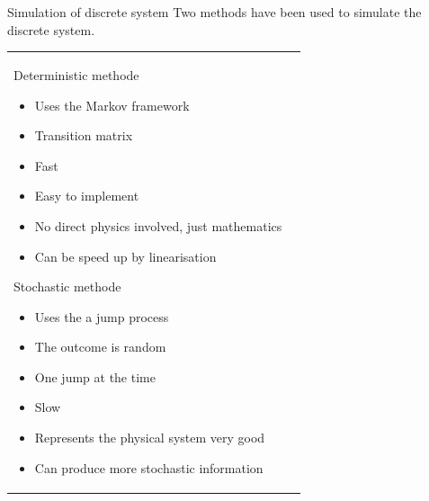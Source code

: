 \begin{frame}{Simulation of discrete system}
  Two methods have been used to simulate the discrete system.
  \begin{tabular}{l l}
  	\begin{minipage}{0.5\textwidth}
  		\begin{block}{Deterministic methode}
		\begin{itemize}
		\item Uses the Markov framework
		\item Transition matrix
		\item Fast
		\item Easy to implement
		\item No direct physics involved, just mathematics
		\item Can be speed up by linearisation
		\end{itemize}
  		\end{block}
  	\end{minipage}
  	\begin{minipage}{0.5\textwidth}
  			\begin{block}{ Stochastic methode}
  				\begin{itemize}
  				  \item Uses the a jump process
  				  \item The outcome is random
  				  \item One jump at the time
  				  \item Slow
  				  \item Represents the physical system very good
  				  \item Can produce more stochastic information
  				\end{itemize}
  		  	\end{block}
  	\end{minipage}
  	\end{tabular}
\end{frame}
